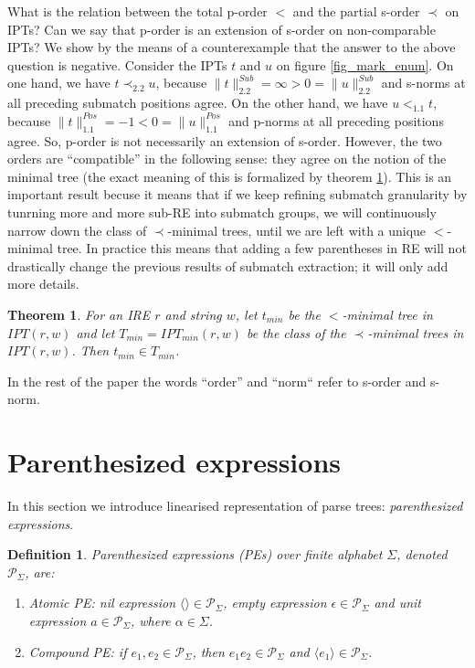 \documentclass[AMA,STIX1COL]{WileyNJD-v2}
\newcommand{\Xl}{\langle}
\newcommand{\Xr}{\rangle}
\newcommand{\Xm}{\langle\!\rangle}
\newcommand{\XP}{\mathcal{P}}
\newcommand{\IPT}{I\!PT}
\newcommand{\pnorm}[2]{\|{#1}\|^{Pos}_{#2}}
\newcommand{\snorm}[2]{\|{#1}\|^{Sub}_{#2}}
\newtheorem{Xdef}{Definition}
\newtheorem{XThe}{Theorem}
\begin{document}
What is the relation between the total p-order $<$ and the partial s-order $\prec$ on IPTs?
Can we say that p-order is an extension of s-order on non-comparable IPTs?
We show by the means of a counterexample that the answer to the above question is negative.
Consider the IPTs $t$ and $u$ on figure \ref{fig_mark_enum}.
On one hand, we have $t \prec_{2.2} u$, because $\snorm{t}{2.2} = \infty > 0 = \snorm{u}{2.2}$ and s-norms at all preceding submatch positions agree.
On the other hand, we have $u <_{1.1} t$, because $\pnorm{t}{1.1} = -1 < 0 = \pnorm{u}{1.1}$
and p-norms at all preceding positions agree.
So, p-order is not necessarily an extension of s-order.
%
However, the two orders are ``compatible'' in the following sense:
they agree on the notion of the minimal tree (the exact meaning of this is formalized by theorem \ref{theorem_order_compat}).
%
This is an important result becuse it means that
if we keep refining submatch granularity by tunrning more and more sub-RE into submatch groups,
we will continuously narrow down the class of $\prec$-minimal trees,
until we are left with a unique $<$-minimal tree.
In practice this means that adding a few parentheses in RE will not drastically change the previous results of submatch extraction;
it will only add more details.

    \begin{XThe}\label{theorem_order_compat}
    For an IRE $r$ and string $w$,
    let $t_{min}$ be the $<$-minimal tree in $\IPT(r,w)$
    and let $T_{min} = \IPT_{min}(r,w)$ be the class of the $\prec$-minimal trees in $\IPT(r,w)$.
    Then $t_{min} \in T_{min}$.
    \end{XThe}

In the rest of the paper the words ``order'' and ``norm`` refer to s-order and s-norm.


\section{Parenthesized expressions}

In this section we introduce linearised representation of parse trees: \emph{parenthesized expressions}.

    \begin{Xdef}
    \emph{Parenthesized expressions (PEs)} over finite alphabet $\Sigma$, denoted $\XP_\Sigma$, are:
    \begin{enumerate}
        \item Atomic PE:
          \emph{nil expression} $\Xm \in \XP_\Sigma$,
          \emph{empty expression} $\epsilon \in \XP_\Sigma$ and
          \emph{unit expression} $a \in \XP_\Sigma$, where $\alpha \in \Sigma$.
        \item Compound PE: if $e_1, e_2 \in \XP_\Sigma$, then
            $e_1 e_2 \in \XP_\Sigma$ and
            $\Xl e_1 \Xr \in \XP_\Sigma$.
    \end{enumerate}
    \end{Xdef}
\end{document}
